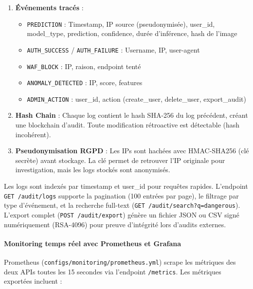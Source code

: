 \begin{enumerate}
    \item \textbf{Événements tracés} :
    \begin{itemize}
        \item \texttt{PREDICTION} : Timestamp, IP source (pseudonymisée), user\_id, model\_type, prediction, confidence, durée d'inférence, hash de l'image
        \item \texttt{AUTH\_SUCCESS} / \texttt{AUTH\_FAILURE} : Username, IP, user-agent
        \item \texttt{WAF\_BLOCK} : IP, raison, endpoint tenté
        \item \texttt{ANOMALY\_DETECTED} : IP, score, features
        \item \texttt{ADMIN\_ACTION} : user\_id, action (create\_user, delete\_user, export\_audit)
    \end{itemize}
    \item \textbf{Hash Chain} : Chaque log contient le hash SHA-256 du log précédent, créant une blockchain d'audit. Toute modification rétroactive est détectable (hash incohérent).
    \item \textbf{Pseudonymisation RGPD} : Les IPs sont hachées avec HMAC-SHA256 (clé secrète) avant stockage. La clé permet de retrouver l'IP originale pour investigation, mais les logs stockés sont anonymisés.
\end{enumerate}

Les logs sont indexés par timestamp et user\_id pour requêtes rapides. L'endpoint \texttt{GET /audit/logs} supporte la pagination (100 entrées par page), le filtrage par type d'événement, et la recherche full-text (\texttt{GET /audit/search?q=dangerous}). L'export complet (\texttt{POST /audit/export}) génère un fichier JSON ou CSV signé numériquement (RSA-4096) pour preuve d'intégrité lors d'audits externes.

\paragraph{Monitoring temps réel avec Prometheus et Grafana}

Prometheus (\texttt{configs/monitoring/prometheus.yml}) scrape les métriques des deux APIs toutes les 15 secondes via l'endpoint \texttt{/metrics}. Les métriques exportées incluent :

